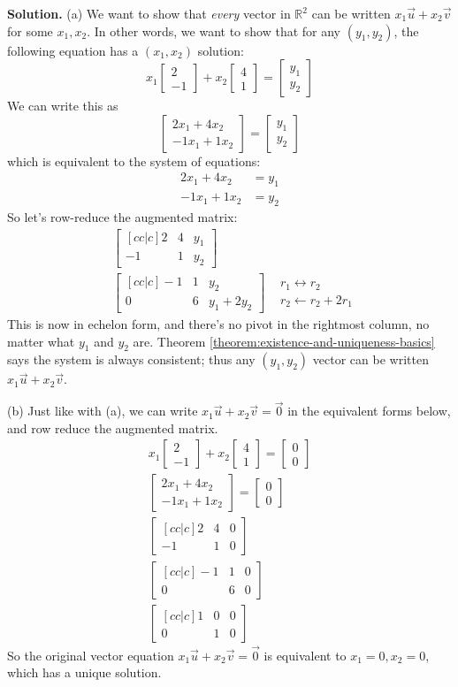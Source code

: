 \documentclass[11pt, letterpaper]{report}
\newenvironment{book}{}{}
\newcounter{theorem}[chapter]
\newcommand{\R}{\mathbb{R}}
\newcommand{\bbvec}[2]{
  \begin{bmatrix} #1 \\ #2 \end{bmatrix}
}
\begin{document}
\begin{book}
\textbf{Solution.} (a) We want to show that \emph{every} vector in $\R^2$ can be written $x_1\vec{u}+x_2 \vec{v}$ for some $x_1,x_2$. In other words, we want to show that for any $(y_1,y_2)$, the following equation has a $(x_1,x_2)$ solution:
\[x_1 \bbvec{2}{-1} + x_2 \bbvec{4}{1} = \bbvec{y_1}{y_2}\]
We can write this as
\[\bbvec{2x_1+4x_2}{-1x_1+1x_2} = \bbvec{y_1}{y_2}\]
which is equivalent to the system of equations:
\[\begin{aligned}
2x_1+4x_2&=y_1 \\
-1x_1+1x_2&=y_{2}
\end{aligned}\]
So let's row-reduce the augmented matrix:
\begin{align*}
&\begin{bmatrix}[cc|c]
2 & 4 & y_1 \\
-1 & 1 & y_2
\end{bmatrix} \\
&\begin{bmatrix}[cc|c]
-1 & 1 & y_2 \\
0 & 6 & y_1 +2y_{2}
\end{bmatrix} &\begin{matrix} r_1 \leftrightarrow r_2 \\ r_2 \leftarrow r_2+2r_1 \end{matrix}
\end{align*}
This is now in echelon form, and there's no pivot in the rightmost column, no matter what $y_1$ and $y_2$ are. Theorem \ref{theorem:existence-and-uniqueness-basics} says the system is always consistent; thus any $(y_1,y_2)$ vector can be written $x_1\vec{u}+x_2\vec{v}$.

(b) Just like with (a), we can write $x_1\vec{u}+x_2\vec{v}= \vec{0}$ in the equivalent forms below, and row reduce the augmented matrix.
\begin{align*}
x_1 \bbvec{2}{-1} + x_2 \bbvec{4}{1} = \bbvec{0}{0} \\
\bbvec{2x_1+4x_2}{-1x_1+1x_2} = \bbvec{0}{0} \\
\begin{bmatrix}[cc|c]
2 & 4 & 0 \\
-1 & 1 & 0
\end{bmatrix} \\
\begin{bmatrix}[cc|c]
-1 & 1 & 0 \\
0 & 6 & 0 
\end{bmatrix} \\
\begin{bmatrix}[cc|c]
1 & 0 & 0 \\
0 & 1 & 0 
\end{bmatrix}
\end{align*}
So the original vector equation $x_1\vec{u}+x_2\vec{v}= \vec{0}$ is equivalent to $x_1=0, x_2=0$, which has a unique solution. \blacksquare
\end{book}
\end{document}
